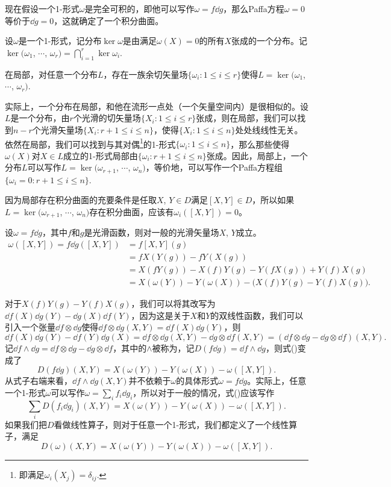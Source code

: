 现在假设一个1-形式$\omega$是完全可积的，即他可以写作$\omega=f\dd g$，那么Paffa方程$\omega=0$等价于$\dd g=0$，这就确定了一个积分曲面。

\para 设$\omega$是一个1-形式，记分布$\ker \omega$是由满足$\omega(X)=0$的所有$X$张成的一个分布。记$\ker(\omega_1$, $\cdots$, $\omega_r)=\bigcap_{i=1}^r\ker \omega_i$.


\para 在局部，对任意一个分布$L$，存在一族余切矢量场$\{\omega_i:1\leq i \leq r\}$使得$L=\ker(\omega_1$, $\cdots$, $\omega_r)$.

实际上，一个分布在局部，和他在流形一点处（一个矢量空间内）是很相似的。设$L$是一个分布，由$r$个光滑的切矢量场$\{X_i:1\leq i \leq r\}$张成，则在局部，我们可以找到$n-r$个光滑矢量场$\{X_i:r+1\leq i \leq n\}$，使得$\{X_i:1\leq i \leq n\}$处处线线性无关。依然在局部，我们可以找到与其对偶\footnote{即满足$\omega_i(X_j)=\delta_{ij}$.}的1-形式$\{\omega_i:1\leq i \leq n\}$，那么那些使得$\omega(X)$对$X\in L$成立的1-形式局部由$\{\omega_i:r+1\leq i \leq n\}$张成。因此，局部上，一个分布$L$可以写作$L=\ker(\omega_{r+1}$, $\cdots$, $\omega_n)$，等价地，可以写作一个Paffa方程组$\{\omega_i=0:r+1\leq i \leq n\}$.

因为局部存在积分曲面的充要条件是任取$X$, $Y\in D$满足$[X,Y]\in D$，所以如果$L=\ker(\omega_{r+1}$, $\cdots$, $\omega_n)$存在积分曲面，应该有$\omega_i([X,Y])=0$。

\para 设$\omega=f\dd g$，其中$f$和$g$是光滑函数，则对一般的光滑矢量场$X$, $Y$成立。
\begin{equation}
\begin{aligned}
	\omega([X,Y])=f\dd g([X,Y])&=f [X,Y](g)\\
	&=fX(Y(g))-fY(X(g))\\
	&=X(fY(g))-X(f)Y(g)-Y(fX(g))+Y(f)X(g)\\
	&=X(\omega(Y))-Y(\omega(X))-\bigl(X(f)Y(g)-Y(f)X(g)\bigr).
\end{aligned}
\end{equation}

对于$X(f)Y(g)-Y(f)X(g)$，我们可以将其改写为$\dd f(X)\dd g(Y)-\dd g(X)\dd f(Y)$，因为这是关于$X$和$Y$的双线性函数，我们可以引入一个张量$\dd f\otimes \dd g$使得$\dd f\otimes \dd g(X,Y)=\dd f(X)\dd g(Y)$，则
\[
	\dd f(X)\dd g(Y)-\dd f(Y)\dd g(X)=\dd f\otimes \dd g(X,Y)-\dd g\otimes \dd f(X,Y)=(\dd f\otimes \dd g-\dd g\otimes \dd f)(X,Y).
\]
记$\dd f\wedge \dd g=\dd f\otimes \dd g-\dd g\otimes \dd f$，其中的$\wedge$被称为，记$D(f\dd g)=\dd f\wedge \dd g$，则式(\theequation)变成了
\[
	D(f\dd g)(X,Y)=X(\omega(Y))-Y(\omega(X))-\omega([X,Y]).
\]
从式子右端来看，$\dd f\wedge \dd g(X,Y)$并不依赖于$\omega$的具体形式$\omega=f\dd g$。实际上，任意一个1-形式$\omega$可以写作$\omega=\sum_i f_i\dd g_i$，所以对于一般的情况，式(\theequation)应该写作
\[
	\sum_iD(f_i\dd g_i)(X,Y)=X(\omega(Y))-Y(\omega(X))-\omega([X,Y]).
\]
如果我们把$D$看做线性算子，则对于任意一个1-形式，我们都定义了一个线性算子，满足
\begin{equation}
	D(\omega)(X,Y)=X(\omega(Y))-Y(\omega(X))-\omega([X,Y]).
	\label{eq:1.3}
\end{equation}

